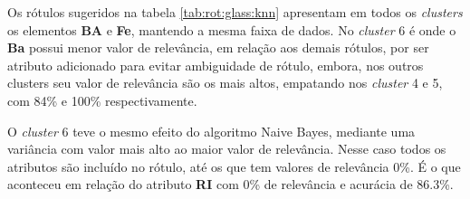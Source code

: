Os rótulos sugeridos na tabela \ref{tab:rot:glass:knn} apresentam em todos os \textit{clusters} os elementos \textbf{BA} e \textbf{Fe}, mantendo a mesma faixa de dados. No \textit{cluster} 6  é onde o \textbf{Ba} possui menor valor de relevância, em relação aos demais rótulos, por ser atributo adicionado para evitar ambiguidade de rótulo, embora, nos outros clusters seu valor de relevância são os mais altos, empatando nos \textit{cluster} 4 e 5, com 84\% e 100\% respectivamente.


O \textit{cluster} 6 teve o mesmo efeito do algoritmo Naive Bayes, mediante uma variância com valor mais alto ao maior valor de relevância. Nesse caso todos os atributos são incluído no rótulo, até os que tem valores de relevância 0\%. É o que aconteceu em relação do atributo \textbf{RI} com 0\% de relevância e acurácia de 86.3\%. 



